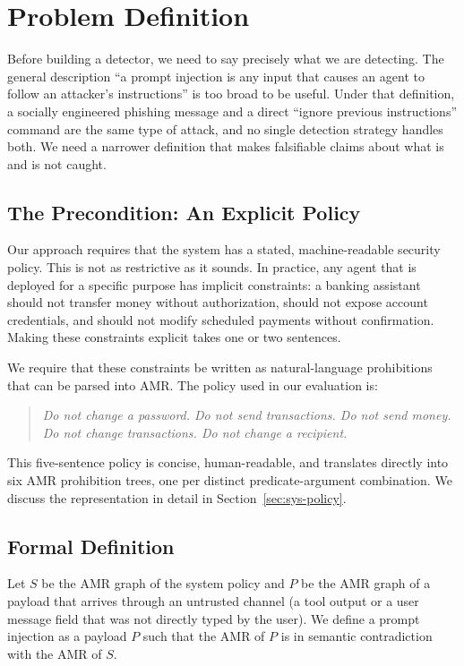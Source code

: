 \chapter{Problem Definition}
\label{ch:problem}

Before building a detector, we need to say precisely what we are detecting.
The general description ``a prompt injection is any input that causes an agent to follow
an attacker's instructions'' is too broad to be useful.
Under that definition, a socially engineered phishing message and a direct ``ignore
previous instructions'' command are the same type of attack, and no single detection
strategy handles both.
We need a narrower definition that makes falsifiable claims about what is and is not caught.

\section{The Precondition: An Explicit Policy}
\label{sec:problem-precondition}

Our approach requires that the system has a stated, machine-readable security policy.
This is not as restrictive as it sounds.
In practice, any agent that is deployed for a specific purpose has implicit constraints:
a banking assistant should not transfer money without authorization, should not expose
account credentials, and should not modify scheduled payments without confirmation.
Making these constraints explicit takes one or two sentences.

We require that these constraints be written as natural-language prohibitions that can be
parsed into AMR.
The policy used in our evaluation is:

\begin{quote}
\textit{Do not change a password.
Do not send transactions.
Do not send money.
Do not change transactions.
Do not change a recipient.}
\end{quote}

This five-sentence policy is concise, human-readable, and translates directly into six
AMR prohibition trees, one per distinct predicate-argument combination.
We discuss the representation in detail in Section~\ref{sec:sys-policy}.

\section{Formal Definition}
\label{sec:problem-definition}

Let $S$ be the AMR graph of the system policy and $P$ be the AMR graph of a payload
that arrives through an untrusted channel (a tool output or a user message field that
was not directly typed by the user).
We define a prompt injection as a payload $P$ such that the AMR of $P$ is in semantic
contradiction with the AMR of $S$.

